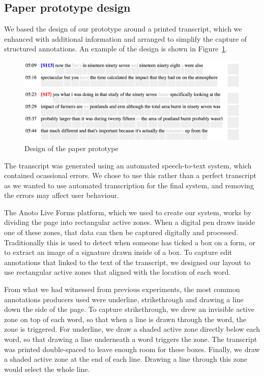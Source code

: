\subsection{Paper prototype design}

We based the design of our prototype around a printed transcript, which we enhanced with additional information and
arranged to simplify the capture of structured annotations. An example of the design is shown in
Figure~\ref{fig:paper-prototype-design}.

\begin{figure}[h]
  \centering
  \includegraphics[width=\columnwidth]{figs/paper-prototype-design}
  \caption{Design of the paper prototype}
  \label{fig:paper-prototype-design}
\end{figure}

The transcript was generated using an automated speech-to-text system, which contained ocassional errors. We chose to
use this rather than a perfect transcript as we wanted to use automated transcription for the final system, and
removing the errors may affect user behaviour.

The Anoto Live Forms platform, which we used to create our system, works by dividing the page into rectangular active
zones.  When a digital pen draws inside one of these zones, that data can then be captured digitally and processed.
Traditionally this is used to detect when someone has ticked a box on a form, or to extract an image of a signature
drawn inside of a box.  To capture edit annotations that linked to the text of the transcript, we designed our layout
to use rectangular active zones that aligned with the location of each word.

From what we had witnessed from previous experiments, the most common annotations producers used were underline,
strikethrough and drawing a line down the side of the page.  To capture strikethrough, we drew an invisible active zone
on top of each word, so that when a line is drawn through the word, the zone is triggered. For underline, we draw a
shaded active zone directly below each word, so that drawing a line underneath a word triggers the zone. The transcript
was printed double-spaced to leave enough room for these boxes. Finally, we draw a shaded active zone at the end of
each line. Drawing a line through this zone would select the whole line.

